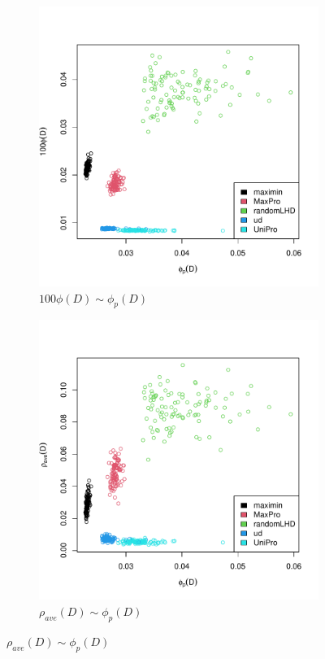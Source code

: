 \documentclass [PhD] {package/uclathes}
\begin{document}
\begin{figure}
\begin{adjustwidth}{-2cm}{-2cm}
\begin{subfigure}[b]{0.3\textwidth}
\end{subfigure}
\begin{subfigure}[b]{0.3\textwidth}
\centering
\caption{$100\phi(D)\sim \phi_p(D)$}
\includegraphics[width=\textwidth]{chapters/EGO/pdfs/phi_p_eta}
\end{subfigure}
\vfill
\begin{subfigure}[b]{0.3\textwidth}
\centering
\caption{$\rho_{ave}(D)\sim \phi_p(D)$}
\includegraphics[width=\textwidth]{chapters/EGO/pdfs/phi_p_rho_ave}

\end{subfigure}
\end{adjustwidth}
\end{figure}
\end{document}
